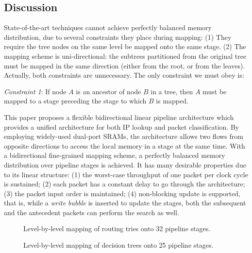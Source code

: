 \documentclass{sigcomm-alternate}
\begin{document}
\subsection{Discussion}
\label{sec:discussion}

State-of-the-art techniques cannot achieve perfectly balanced memory distribution, due to several constraints they place during mapping: (1) They require the tree nodes on the same level be mapped onto the same stage. (2) The mapping scheme is uni-directional: the subtrees partitioned from the original tree must be mapped in the same direction (either from the root, or from the leaves). Actually, both constraints are unnecessary. The only constraint we must obey is:

\textit{Constraint 1}: If node $A$ is an ancestor of node $B$ in a tree, then $A$ must be mapped to a stage preceding the stage to which $B$ is mapped.


This paper proposes a flexible bidirectional linear pipeline architecture which provides a unified architecture for both IP lookup and packet classification. By employing widely-used dual-port SRAMs, the architecture allows two flows from opposite directions to access the local memory in a stage at the same time. With a bidirectional fine-grained mapping scheme, a perfectly balanced memory distribution over pipeline stages is achieved. It has many desirable properties due to its linear structure: (1) the worst-case throughput of one packet per clock cycle is sustained; (2) each packet has a constant delay to go through the architecture; (3) the packet input order is maintained; (4) non-blocking update is supported, that is, while a \textit{write bubble} is inserted to update the stages, both the subsequent and the antecedent packets can perform the search as well. 

\begin{figure*}[hbt]
\centering
{}
\hfil
{}
\caption{Level-by-level mapping of routing tries onto 32 pipeline stages.}
\label{fig:level_mapping}
\end{figure*}

\begin{figure*}[hbt]
\centering
{}
\hfil
{}
\caption{Level-by-level mapping of decision trees onto 25 pipeline stages.}
\label{fig:pkt_level_mapping}
\end{figure*}
\end{document}

